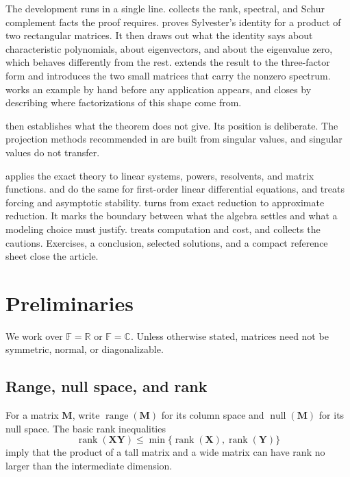 \documentclass[11pt]{article}
\newcommand{\F}{\mathbb{F}}
\newcommand{\R}{\mathbb{R}}
\newcommand{\C}{\mathbb{C}}
\newcommand{\mat}[1]{\mathbf{#1}}
\newcommand{\rank}{\operatorname{rank}}
\newcommand{\range}{\operatorname{range}}
\newcommand{\nullsp}{\operatorname{null}}
\theoremstyle{definition}
\theoremstyle{remark}
\begin{document}
The development runs in a single line.  collects the rank, spectral, and Schur complement facts the proof requires.  proves Sylvester's identity for a product of two rectangular matrices. It then draws out what the identity says about characteristic polynomials, about eigenvectors, and about the eigenvalue zero, which behaves differently from the rest.  extends the result to the three-factor form and introduces the two small matrices that carry the nonzero spectrum.  works an example by hand before any application appears, and closes by describing where factorizations of this shape come from.

 then establishes what the theorem does not give. Its position is deliberate. The projection methods recommended in  are built from singular values, and singular values do not transfer.

 applies the exact theory to linear systems, powers, resolvents, and matrix functions.  and  do the same for first-order linear differential equations, and  treats forcing and asymptotic stability.  turns from exact reduction to approximate reduction. It marks the boundary between what the algebra settles and what a modeling choice must justify.  treats computation and cost, and  collects the cautions. Exercises, a conclusion, selected solutions, and a compact reference sheet close the article.

\section{Preliminaries}
\label{sec:preliminaries}

We work over \(\F=\R\) or \(\F=\C\). Unless otherwise stated, matrices need not be symmetric, normal, or diagonalizable.

\subsection{Range, null space, and rank}

For a matrix \(\mat{M}\), write \(\range(\mat{M})\) for its column space and \(\nullsp(\mat{M})\) for its null space. The basic rank inequalities
\begin{equation}
  \rank(\mat{X}\mat{Y})
  \leq
  \min\{\rank(\mat{X}),\rank(\mat{Y})\}
  \label{eq:rank-product}
\end{equation}
imply that the product of a tall matrix and a wide matrix can have rank no larger than the intermediate dimension.
\end{document}
